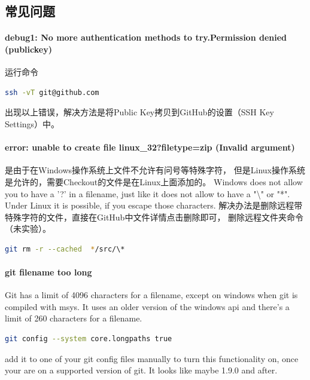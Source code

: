 \documentclass{book}
\begin{document}
\subsection{常见问题}

\paragraph{debug1: No more authentication methods to try.Permission denied (publickey)}运行命令

\begin{lstlisting}[language=Bash]
ssh -vT git@github.com
\end{lstlisting}

出现以上错误，解决方法是将Public Key拷贝到GitHub的设置（SSH Key Settings）中。

\paragraph{error: unable to create file linux\_32?filetype=zip (Invalid argument)}
是由于在Windows操作系统上文件不允许有问号等特殊字符，
但是Linux操作系统是允许的，需要Checkout的文件是在Linux上面添加的。
Windows does not allow you to have a '?' in a filename, 
just like it does not allow to have a "\textbackslash" or "*". 
Under Linux it is possible, if you escape those characters. 
解决办法是删除远程带特殊字符的文件，直接在GitHub中文件详情点击删除即可，
删除远程文件夹命令（未实验）。

\begin{lstlisting}[language=Bash]
git rm -r --cached  */src/\* 
\end{lstlisting}

\paragraph{git filename too long}

Git has a limit of 4096 characters for a filename, 
except on windows when git is compiled with msys. 
It uses an older version of the windows api 
and there's a limit of 260 characters for a filename.

\begin{lstlisting}[language=Bash]
git config --system core.longpaths true	
\end{lstlisting}

add it to one of your git config files manually to turn this functionality on, 
once your are on a supported version of git. It looks like maybe 1.9.0 and after.
\end{document}
